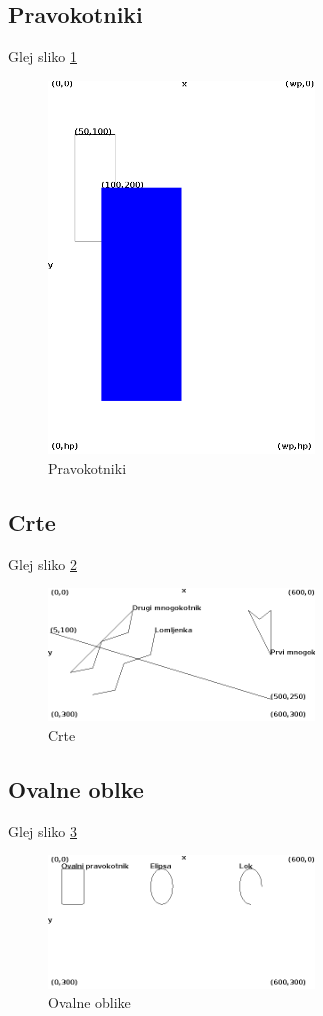 \documentclass[a4paper,oneside,12pt]{article}
\theoremstyle{definition}
\begin{document}
	\subsection{Pravokotniki}
		Glej sliko \ref{fig:prav}\\
		\begin{figure}[h]
	        \includegraphics[width=200pt, keepaspectratio=true]{Pravokotniki.png}
	        \caption{Pravokotniki}
	        \label{fig:prav}
	    \end{figure}

	\subsection{Crte}
		Glej sliko \ref{fig:crte}\\
		\begin{figure}[h]
	        \includegraphics[width=200pt, keepaspectratio=true]{Crte.png}
	        \caption{Crte}
	        \label{fig:crte}
	    \end{figure}

		\subsection{Ovalne oblke}
			Glej sliko \ref{fig:oval}\\
			\begin{figure}[h]
				\includegraphics[width=200pt, keepaspectratio=true]{Krogi.png}
				\caption{Ovalne oblike}
				\label{fig:oval}
			\end{figure}
\end{document}
